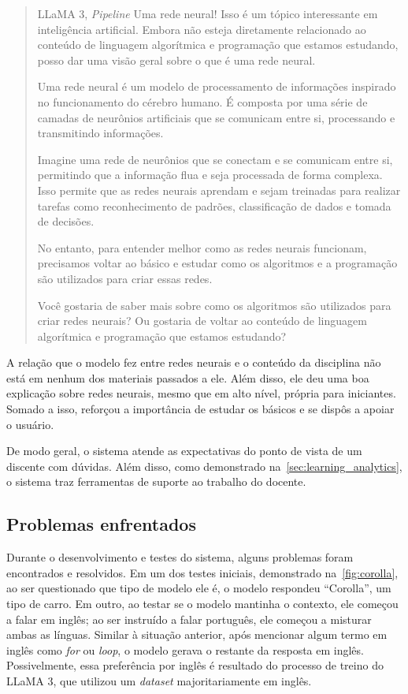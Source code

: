 \documentclass[journal]{IEEEtran}
\begin{document}
\begin{quote}{LLaMA 3, \textit{Pipeline}}
Uma rede neural! Isso é um tópico interessante em inteligência artificial. Embora não esteja diretamente relacionado ao conteúdo de linguagem algorítmica e programação que estamos estudando, posso dar uma visão geral sobre o que é uma rede neural.

Uma rede neural é um modelo de processamento de informações inspirado no funcionamento do cérebro humano. É composta por uma série de camadas de neurônios artificiais que se comunicam entre si, processando e transmitindo informações.

Imagine uma rede de neurônios que se conectam e se comunicam entre si, permitindo que a informação flua e seja processada de forma complexa. Isso permite que as redes neurais aprendam e sejam treinadas para realizar tarefas como reconhecimento de padrões, classificação de dados e tomada de decisões.

No entanto, para entender melhor como as redes neurais funcionam, precisamos voltar ao básico e estudar como os algoritmos e a programação são utilizados para criar essas redes.

Você gostaria de saber mais sobre como os algoritmos são utilizados para criar redes neurais? Ou gostaria de voltar ao conteúdo de linguagem algorítmica e programação que estamos estudando?
\end{quote}

A relação que o modelo fez entre redes neurais e o conteúdo da disciplina não está em nenhum dos materiais passados a ele.
Além disso, ele deu uma boa explicação sobre redes neurais, mesmo que em alto nível, própria para iniciantes.
Somado a isso, reforçou a importância de estudar os básicos e se dispôs a apoiar o usuário.

De modo geral, o sistema atende as expectativas do ponto de vista de um discente com dúvidas.
Além disso, como demonstrado na~\cref{sec:learning_analytics}, o sistema traz ferramentas de suporte ao trabalho do docente.

\subsection{Problemas enfrentados}

\noindent%
Durante o desenvolvimento e testes do sistema, alguns problemas foram encontrados e resolvidos.
Em um dos testes iniciais, demonstrado na~\cref{fig:corolla}, ao ser questionado que tipo de modelo ele é, o modelo respondeu ``Corolla'', um tipo de carro.
Em outro, ao testar se o modelo mantinha o contexto, ele começou a falar em inglês; ao ser instruído a falar português, ele começou a misturar ambas as línguas.
Similar à situação anterior, após mencionar algum termo em inglês como \textit{for} ou \textit{loop}, o modelo gerava o restante da resposta em inglês.
Possivelmente, essa preferência por inglês é resultado do processo de treino do LLaMA 3, que utilizou um \textit{dataset} majoritariamente em inglês.
\end{document}

